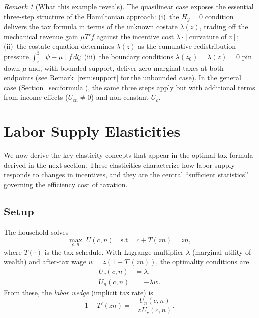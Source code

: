 \documentclass[12pt,a4paper]{article}
\theoremstyle{definition}
\theoremstyle{plain}
\theoremstyle{remark}
\newtheorem{remark}{Remark}[section]
\newcommand{\zbar}{\bar{z}}
\newcommand{\zlow}{z_{\scriptscriptstyle 0}}
\begin{document}
\begin{remark}[What this example reveals]
The quasilinear case exposes the essential three-step structure of the Hamiltonian approach: (i)~the $H_y = 0$ condition delivers the tax formula in terms of the unknown costate $\lambda(z)$, trading off the mechanical revenue gain $\mu T' f$ against the incentive cost $\lambda \cdot [\text{curvature of } v]$; (ii)~the costate equation determines $\lambda(z)$ as the cumulative redistribution pressure $\int_z^{\zbar}[\psi - \mu]\,f\,d\zeta$; (iii)~the boundary conditions $\lambda(\zlow) = \lambda(\zbar) = 0$ pin down $\mu$ and, with bounded support, deliver zero marginal taxes at both endpoints (see Remark~\ref{rem:support} for the unbounded case). In the general case (Section~\ref{sec:formula}), the same three steps apply but with additional terms from income effects ($U_{cn} \neq 0$) and non-constant $U_c$.
\end{remark}

\section{Labor Supply Elasticities}
\label{sec:elasticities}

We now derive the key elasticity concepts that appear in the optimal tax formula derived in the next section. These elasticities characterize how labor supply responds to changes in incentives, and they are the central ``sufficient statistics'' governing the efficiency cost of taxation.

\subsection{Setup}

The household solves
\[
  \max_{c,n} \; U(c,n) \quad \text{s.t.} \quad c + T(zn) = zn,
\]
where $T(\cdot)$ is the tax schedule. With Lagrange multiplier $\lambda$ (marginal utility of wealth) and after-tax wage $w = z(1 - T'(zn))$, the optimality conditions are
\begin{align}
  U_c(c,n) &= \lambda, \label{eq:HH_c} \\
  U_n(c,n) &= -\lambda w. \label{eq:HH_n}
\end{align}
From these, the \emph{labor wedge} (implicit tax rate) is
\begin{equation}
\label{eq:tax_wedge}
  1 - T'(zn) = -\frac{U_n(c,n)}{z \, U_c(c,n)}.
\end{equation}
\end{document}
